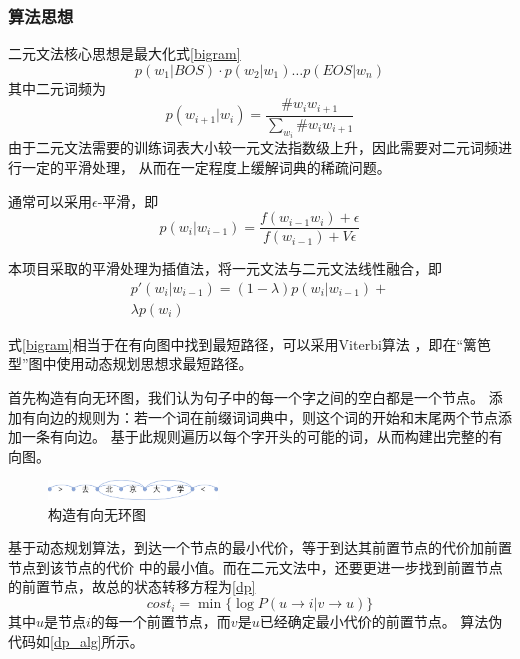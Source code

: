 \subsubsection{算法思想}

二元文法核心思想是最大化式\ref{bigram}
\begin{equation}
  p\left(w_1|BOS\right) \cdot p\left(w_2|w_1\right) \ldots p\left(EOS|w_n\right)
  \label{bigram}
\end{equation}
其中二元词频为
\begin{equation}
  p\left(w_{i+1}|w_i\right) = \dfrac{\# w_i w_{i+1}}{\sum_{w_i} \# w_i w_{i+1}}
\end{equation}
由于二元文法需要的训练词表大小较一元文法指数级上升，因此需要对二元词频进行一定的平滑处理，
从而在一定程度上缓解词典的稀疏问题。

通常可以采用$\epsilon$-平滑，即
\begin{equation}
  p(w_i|w_{i-1})=\dfrac{f(w_{i-1} w_i)+\epsilon}{f(w_{i-1})+V \epsilon}
\end{equation}

本项目采取的平滑处理为插值法，将一元文法与二元文法线性融合，即
\begin{equation}
  \begin{split}
    p'\left(w_i|w_{i-1}\right)=
    \left(1-\lambda\right)p\left(w_i|w_{i-1}\right)+\\
    \lambda p\left(w_i\right)
  \end{split}
\end{equation}

式\ref{bigram}相当于在有向图中找到最短路径，可以采用Viterbi算法
\citep{forney1973viterbi}，即在“篱笆型”图中使用动态规划思想求最短路径。

首先构造有向无环图，我们认为句子中的每一个字之间的空白都是一个节点。
添加有向边的规则为：若一个词在前缀词词典中，则这个词的开始和末尾两个节点添加一条有向边。
基于此规则遍历以每个字开头的可能的词，从而构建出完整的有向图。

\begin{figure}[H]
  \centering
  \includegraphics[width=0.4\textwidth]{figures/figure_07.png}
  \caption{构造有向无环图}
\end{figure}

基于动态规划算法，到达一个节点的最小代价，等于到达其前置节点的代价加前置节点到该节点的代价
中的最小值。而在二元文法中，还要更进一步找到前置节点的前置节点，故总的状态转移方程为\ref{dp}
\begin{equation}
  cost_i = \min \{ \log P\left(u \rightarrow i | v \rightarrow u \right) \}
  \label{dp}
\end{equation}
其中$u$是节点$i$的每一个前置节点，而$v$是$u$已经确定最小代价的前置节点。
算法伪代码如\ref{dp_alg}所示。

